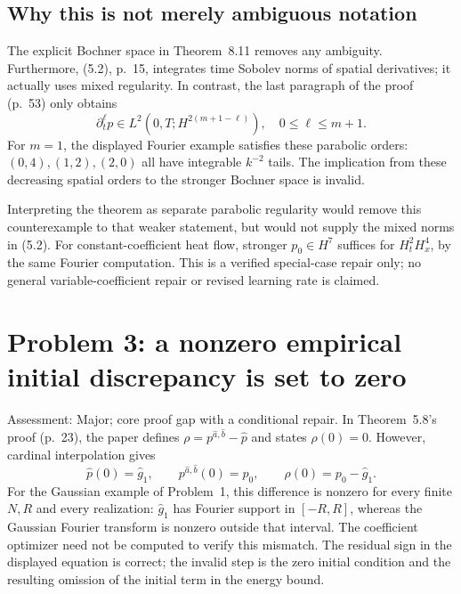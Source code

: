 \documentclass[10pt]{article}
\begin{document}
\subsection*{Why this is not merely ambiguous notation}
The explicit Bochner space in Theorem 8.11 removes any ambiguity. Furthermore, (5.2), p. 15, integrates time Sobolev norms of spatial derivatives; it actually uses mixed regularity. In contrast, the last paragraph of the proof (p. 53) only obtains \[\partial_t^\ell p\in
 L^2(0,T;H^{2(m+1-\ell)}),\quad 0\le\ell\le m+1 .\] For \(m=1\), the displayed Fourier example satisfies these parabolic orders: \((0,4),(1,2),(2,0)\) all have integrable \(k^{-2}\) tails. The implication from these decreasing spatial orders to the stronger Bochner space is invalid.\par
Interpreting the theorem as separate parabolic regularity would remove this counterexample to that weaker statement, but would not supply the mixed norms in (5.2). For constant-coefficient heat flow, stronger \(p_0\in H^7\) suffices for \(H^2_tH^4_x\), by the same Fourier computation. This is a verified special-case repair only; no general variable-coefficient repair or revised learning rate is claimed.\par
\section*{Problem 3: a nonzero empirical initial discrepancy is set to zero}
Assessment: Major; core proof gap with a conditional repair. In Theorem 5.8’s proof (p. 23), the paper defines \(\rho=p^{\widehat a,\widehat b}-\widehat p\) and states \(\rho(0)=0\). However, cardinal interpolation gives \[\widehat p(0)=\widehat g_1,\qquad
 p^{\widehat a,\widehat b}(0)=p_0,\qquad
 \rho(0)=p_0-\widehat g_1 .\] For the Gaussian example of Problem 1, this difference is nonzero for every finite \(N,R\) and every realization: \(\widehat g_1\) has Fourier support in \([-R,R]\), whereas the Gaussian Fourier transform is nonzero outside that interval. The coefficient optimizer need not be computed to verify this mismatch. The residual sign in the displayed equation is correct; the invalid step is the zero initial condition and the resulting omission of the initial term in the energy bound.\par
\end{document}
